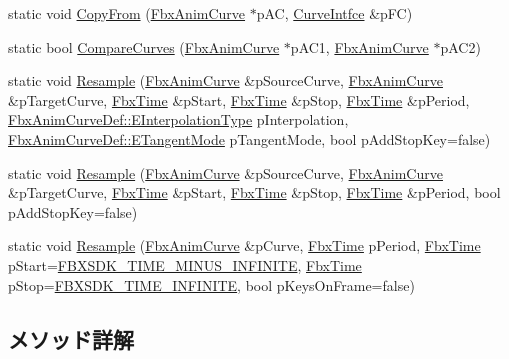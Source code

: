 \begin{DoxyCompactItemize}
\item 
static void \hyperlink{class_fbx_anim_utilities_accddd7a975ab0eb0f042903846a14704}{Copy\+From} (\hyperlink{class_fbx_anim_curve}{Fbx\+Anim\+Curve} $\ast$p\+AC, \hyperlink{class_fbx_anim_utilities_1_1_curve_intfce}{Curve\+Intfce} \&p\+FC)
\item 
static bool \hyperlink{class_fbx_anim_utilities_a613e164f8bfb96506a7ffb8e4a5747ae}{Compare\+Curves} (\hyperlink{class_fbx_anim_curve}{Fbx\+Anim\+Curve} $\ast$p\+A\+C1, \hyperlink{class_fbx_anim_curve}{Fbx\+Anim\+Curve} $\ast$p\+A\+C2)
\item 
static void \hyperlink{class_fbx_anim_utilities_ad9fce04e63f88c748c00a9451b4b099b}{Resample} (\hyperlink{class_fbx_anim_curve}{Fbx\+Anim\+Curve} \&p\+Source\+Curve, \hyperlink{class_fbx_anim_curve}{Fbx\+Anim\+Curve} \&p\+Target\+Curve, \hyperlink{class_fbx_time}{Fbx\+Time} \&p\+Start, \hyperlink{class_fbx_time}{Fbx\+Time} \&p\+Stop, \hyperlink{class_fbx_time}{Fbx\+Time} \&p\+Period, \hyperlink{class_fbx_anim_curve_def_add2ab7d10d856ab0868cc9b143d59ea5}{Fbx\+Anim\+Curve\+Def\+::\+E\+Interpolation\+Type} p\+Interpolation, \hyperlink{class_fbx_anim_curve_def_ac810ccc5ca0527704ab5175479964b87}{Fbx\+Anim\+Curve\+Def\+::\+E\+Tangent\+Mode} p\+Tangent\+Mode, bool p\+Add\+Stop\+Key=false)
\item 
static void \hyperlink{class_fbx_anim_utilities_a7ca36067a237e86124878d2000ddd9e5}{Resample} (\hyperlink{class_fbx_anim_curve}{Fbx\+Anim\+Curve} \&p\+Source\+Curve, \hyperlink{class_fbx_anim_curve}{Fbx\+Anim\+Curve} \&p\+Target\+Curve, \hyperlink{class_fbx_time}{Fbx\+Time} \&p\+Start, \hyperlink{class_fbx_time}{Fbx\+Time} \&p\+Stop, \hyperlink{class_fbx_time}{Fbx\+Time} \&p\+Period, bool p\+Add\+Stop\+Key=false)
\item 
static void \hyperlink{class_fbx_anim_utilities_a3fde586a335a5296a9c5a215993b8a52}{Resample} (\hyperlink{class_fbx_anim_curve}{Fbx\+Anim\+Curve} \&p\+Curve, \hyperlink{class_fbx_time}{Fbx\+Time} p\+Period, \hyperlink{class_fbx_time}{Fbx\+Time} p\+Start=\hyperlink{fbxtime_8h_ad274ec1f909723127ab573a52f8be216}{F\+B\+X\+S\+D\+K\+\_\+\+T\+I\+M\+E\+\_\+\+M\+I\+N\+U\+S\+\_\+\+I\+N\+F\+I\+N\+I\+TE}, \hyperlink{class_fbx_time}{Fbx\+Time} p\+Stop=\hyperlink{fbxtime_8h_a1e6db3fe0f84f0b7daa775739f93526f}{F\+B\+X\+S\+D\+K\+\_\+\+T\+I\+M\+E\+\_\+\+I\+N\+F\+I\+N\+I\+TE}, bool p\+Keys\+On\+Frame=false)
\end{DoxyCompactItemize}


\subsection{メソッド詳解}
\mbox{\label{class_fbx_anim_utilities_a613e164f8bfb96506a7ffb8e4a5747ae}} 
